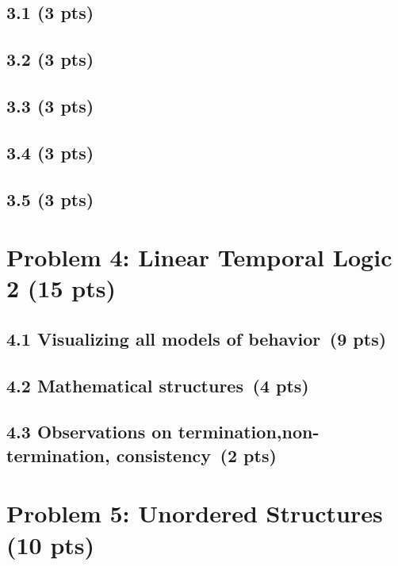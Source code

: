 \documentclass[11pt]{article}
\begin{document}
\subsection*{3.1 (3 pts)}

\subsection*{3.2 (3 pts)}

\subsection*{3.3 (3 pts)}

\subsection*{3.4 (3 pts)}

\subsection*{3.5 (3 pts)}

\newpage
\section{Problem 4: Linear Temporal Logic 2 (15 pts)}

\subsection*{4.1 Visualizing all models of behavior \,(9 pts)}

\subsection*{4.2 Mathematical structures \,(4 pts)}

\subsection*{4.3 Observations on termination,\newline non-termination, consistency \,(2 pts)}

\newpage
\section{Problem 5: Unordered Structures (10 pts)}
\end{document}
